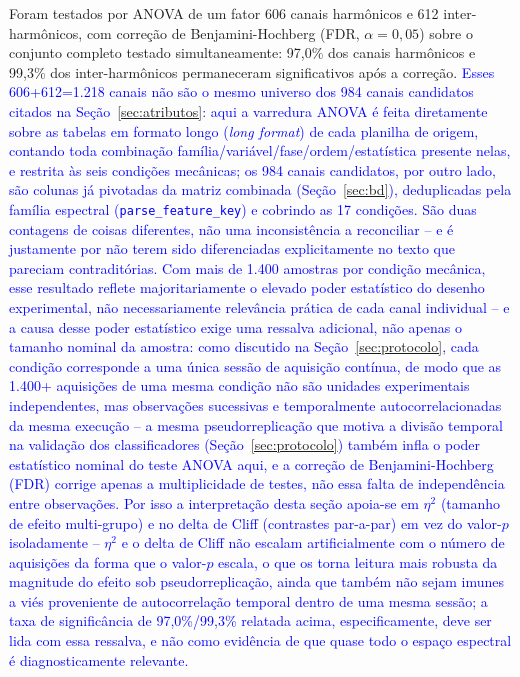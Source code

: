\documentclass[times,final]{elsarticle}
\begin{document}
Foram testados por ANOVA de um fator 606 canais harmônicos e 612 inter-harmônicos, com correção de Benjamini-Hochberg (FDR, $\alpha=0{,}05$) sobre o conjunto completo testado simultaneamente: 97,0\% dos canais harmônicos e 99,3\% dos inter-harmônicos permaneceram significativos após a correção. \textcolor{blue}{Esses 606+612=1.218 canais não são o mesmo universo dos 984 canais candidatos citados na Seção~\ref{sec:atributos}: aqui a varredura ANOVA é feita diretamente sobre as tabelas em formato longo (\textit{long format}) de cada planilha de origem, contando toda combinação família/variável/fase/ordem/estatística presente nelas, e restrita às seis condições mecânicas; os 984 canais candidatos, por outro lado, são colunas já pivotadas da matriz combinada (Seção~\ref{sec:bd}), deduplicadas pela família espectral (\texttt{parse\_feature\_key}) e cobrindo as 17 condições. São duas contagens de coisas diferentes, não uma inconsistência a reconciliar -- e é justamente por não terem sido diferenciadas explicitamente no texto que pareciam contraditórias.} \textcolor{blue}{Com mais de 1.400 amostras por condição mecânica, esse resultado reflete majoritariamente o elevado poder estatístico do desenho experimental, não necessariamente relevância prática de cada canal individual -- e a causa desse poder estatístico exige uma ressalva adicional, não apenas o tamanho nominal da amostra: como discutido na Seção~\ref{sec:protocolo}, cada condição corresponde a uma única sessão de aquisição contínua, de modo que as 1.400+ aquisições de uma mesma condição não são unidades experimentais independentes, mas observações sucessivas e temporalmente autocorrelacionadas da mesma execução -- a mesma pseudorreplicação que motiva a divisão temporal na validação dos classificadores (Seção~\ref{sec:protocolo}) também infla o poder estatístico nominal do teste ANOVA aqui, e a correção de Benjamini-Hochberg (FDR) corrige apenas a multiplicidade de testes, não essa falta de independência entre observações. Por isso a interpretação desta seção apoia-se em $\eta^2$ (tamanho de efeito multi-grupo) e no delta de Cliff (contrastes par-a-par) em vez do valor-$p$ isoladamente -- $\eta^2$ e o delta de Cliff não escalam artificialmente com o número de aquisições da forma que o valor-$p$ escala, o que os torna leitura mais robusta da magnitude do efeito sob pseudorreplicação, ainda que também não sejam imunes a viés proveniente de autocorrelação temporal dentro de uma mesma sessão; a taxa de significância de 97,0\%/99,3\% relatada acima, especificamente, deve ser lida com essa ressalva, e não como evidência de que quase todo o espaço espectral é diagnosticamente relevante.}
\end{document}
